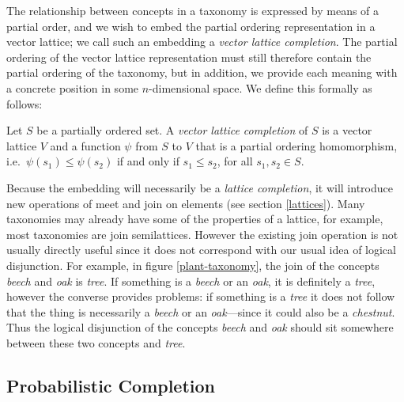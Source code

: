 
The relationship between concepts in a taxonomy is expressed by means of a partial order, and we wish to embed the partial ordering representation in a vector lattice; we call such an embedding a \emph{vector lattice completion}. The partial ordering of the vector lattice representation must still therefore contain the partial ordering of the taxonomy, but in addition, we provide each meaning with a concrete position in some $n$-dimensional space. We define this formally as follows:
\begin{defn}
Let $S$ be a partially ordered set. A \emph{vector lattice completion} of $S$ is a vector lattice $V$ and a function $\psi$ from $S$ to $V$ that is a partial ordering homomorphism, i.e.~$\psi(s_1) \le \psi(s_2)$ if and only if $s_1 \le s_2$, for all $s_1, s_2 \in S$.
\end{defn}

Because the embedding will necessarily be a \emph{lattice completion}, it will introduce new operations of meet and join on elements (see section \ref{lattices}). Many taxonomies may already have some of the properties of a lattice, for example, most taxonomies are join semilattices. However the existing join operation is not usually directly useful since it does not correspond with our usual idea of logical disjunction. For example, in figure \ref{plant-taxonomy}, the join of the concepts \emph{beech} and \emph{oak} is \emph{tree}. If something is a \emph{beech} or an \emph{oak}, it is definitely a \emph{tree}, however the converse provides problems: if something is a \emph{tree} it does not follow that the thing is necessarily a \emph{beech} or an \emph{oak}---since it could also be a \emph{chestnut}. Thus the logical disjunction of the concepts \emph{beech} and \emph{oak} should sit somewhere between these two concepts and \emph{tree}.

\subsection{Probabilistic Completion}
\label{probabilistic-completion-section}

